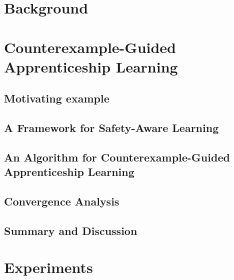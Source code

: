 \chapter{Background}
\label{sec:background}
\thispagestyle{myheadings}



\chapter{Counterexample-Guided Apprenticeship Learning}

\section{Motivating example}
\label{sec:section3}
\graphicspath{{2_Body/section3/figures/}}


\section{A Framework for Safety-Aware Learning}
\label{sec:section4}
\graphicspath{{2_Body/section4/figures/}}


\section{An Algorithm for Counterexample-Guided Apprenticeship Learning}
\label{sec:section5}
\graphicspath{{2_Body/section5/figures/}}


\section{Convergence Analysis}
\label{sec:section6}
\graphicspath{{2_Body/section6/figures/}}


\section{Summary and Discussion}
\label{sec:section7}
\graphicspath{{2_Body/section7/figures/}}


\chapter{Experiments}
\label{sec:exp}
\graphicspath{{2_Body/experiments/figures/}}

